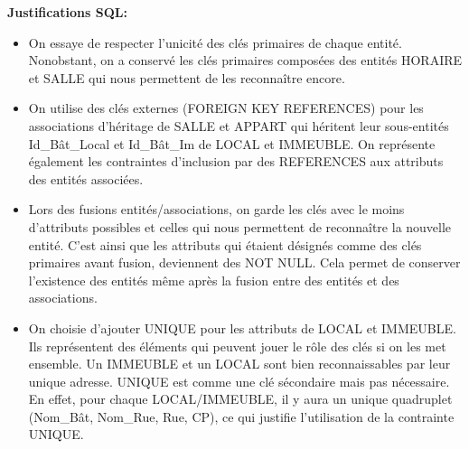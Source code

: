 \documentclass[a4paper,10.5pt]{report}
\begin{document}
	\textbf{Justifications SQL\@: }
	\begin{itemize}
		\item On essaye de respecter l'unicité des clés primaires de chaque entité. Nonobstant, on a conservé les clés primaires composées des entités HORAIRE et SALLE qui nous permettent de les reconnaître encore. 
		\item On utilise des clés externes (FOREIGN KEY REFERENCES) pour les associations d'héritage de SALLE et APPART qui héritent leur sous-entités Id\_Bât\_Local et Id\_Bât\_Im de LOCAL et IMMEUBLE\@. On représente également les contraintes d'inclusion par des REFERENCES aux attributs des entités associées.
		\item Lors des fusions entités/associations, on garde les clés avec le moins d'attributs possibles et celles qui nous permettent de reconnaître la nouvelle entité. C'est ainsi que les attributs qui étaient désignés comme des clés primaires avant fusion, deviennent des NOT NULL\@. Cela permet de conserver l'existence des entités même après la fusion entre des entités et des associations.
		\item On choisie d'ajouter UNIQUE pour les attributs de LOCAL et IMMEUBLE\@. Ils représentent des éléments qui peuvent jouer le rôle des clés si on les met ensemble. Un IMMEUBLE et un LOCAL sont bien reconnaissables par leur unique adresse. UNIQUE est comme une clé sécondaire mais pas nécessaire. En effet, pour chaque LOCAL/IMMEUBLE, il y aura un unique quadruplet (Nom\_Bât, Nom\_Rue, Rue, CP), ce qui justifie l'utilisation de la contrainte UNIQUE\@.
		 
	\end{itemize}
\end{document}
